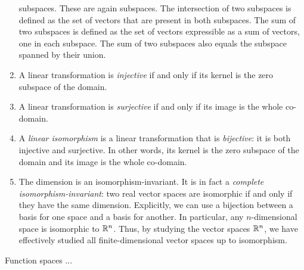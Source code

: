\documentclass[10pt]{amsart}
\begin{document}
\begin{enumerate}
  subspaces. These are again subspaces. The intersection of two
  subspaces is defined as the set of vectors that are present in both
  subspaces. The sum of two subspaces is defined as the set of vectors
  expressible as a sum of vectors, one in each subspace. The sum of
  two subspaces also equals the subspace spanned by their union.
\item A linear transformation is {\em injective} if and only if its
  kernel is the zero subspace of the domain.
\item A linear transformation is {\em surjective} if and only if its
  image is the whole co-domain.
\item A {\em linear isomorphism} is a linear transformation that is
  {\em bijective}: it is both injective and surjective. In other
  words, its kernel is the zero subspace of the domain and its image
  is the whole co-domain.
\item The dimension is an isomorphism-invariant. It is in fact a {\em
  complete isomorphism-invariant}: two real vector spaces are
  isomorphic if and only if they have the same dimension. Explicitly,
  we can use a bijection between a basis for one space and a basis for
  another. In particular, any $n$-dimensional space is isomorphic to
  $\mathbb{R}^n$. Thus, by studying the vector spaces $\mathbb{R}^n$, we have
  effectively studied all finite-dimensional vector spaces up to
  isomorphism.
\end{enumerate}

Function spaces ...
\end{document}
